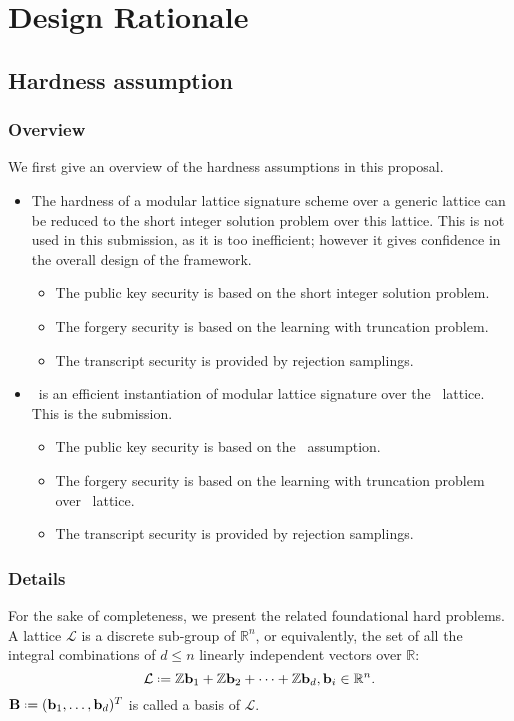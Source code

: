 \documentclass{llncs}
\newcommand{\Lcal}{{\mathcal L}}
\newcommand{\RR}{\mathbb{R}}
\newcommand{\ZZ}{\mathbb{Z}}
\newcommand{\bfb}{{\bf b}}
\newcommand{\bfB}{{\bf B}}
\newcommand{\pqntrusign}{{\sf{pqNTRUSign}}}
\newcommand{\ntru}{{\sf{NTRU}}}
\newcommand{\<}{\langle}
\renewcommand{\>}{\rangle}
\newcommand*{\defeq}{\mathrel{\vcenter{\baselineskip0.5ex \lineskiplimit0pt
                     \hbox{\scriptsize.}\hbox{\scriptsize.}}}%
                     =}
\begin{document}
\section{Design Rationale}
\subsection{Hardness assumption}
\subsubsection{Overview} We first give an overview of the hardness
assumptions in this proposal.
\begin{itemize}
\item The hardness of a modular lattice signature scheme
 over a generic lattice can be reduced to the
short integer solution problem over this lattice. 
This is not used in this submission, as it is too inefficient; however it gives confidence
in the overall design of the framework.
\begin{itemize}
\item The public key security is based on the short integer solution
problem.
\item The forgery security is based on the learning with truncation 
problem.
\item The transcript security is provided by rejection samplings.
\end{itemize} 
\item \pqntrusign~is an efficient instantiation of modular lattice
signature over the \ntru~lattice. This is the submission.
\begin{itemize}
\item The public key security is based on the \ntru~assumption.
\item The forgery security is based on the learning with truncation 
problem over \ntru~lattice.
\item The transcript security is provided by rejection samplings.
\end{itemize} 

\end{itemize}

\subsubsection{Details}

For the sake of completeness, we present the related foundational hard problems. 
A lattice $\Lcal$ is a discrete sub-group of $\RR^n$, or equivalently,
the set of all the integral combinations of $d \leq n$ linearly independent vectors over $\RR$:
$$\Lcal \defeq \ZZ \bfb_1+ \ZZ \bfb_2 + \dots + \ZZ \bfb_d , \bfb_i \in \RR^n.$$
$\bfB \defeq ( \bfb_1 ,\dots ,\bfb_d )^T$ is called a basis of $\Lcal$.
\end{document}

